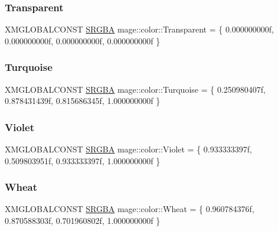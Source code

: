 \hypertarget{namespacemage_1_1color_a8f082eed46cfcf7c8c1c8bc206b6e501}{}\label{namespacemage_1_1color_a8f082eed46cfcf7c8c1c8bc206b6e501} 
\subsubsection{\texorpdfstring{Transparent}{Transparent}}
{\footnotesize\ttfamily X\+M\+G\+L\+O\+B\+A\+L\+C\+O\+N\+ST \hyperlink{structmage_1_1_s_r_g_b_a}{S\+R\+G\+BA} mage\+::color\+::\+Transparent = \{ 0.\+000000000f, 0.\+000000000f, 0.\+000000000f, 0.\+000000000f \}}

\hypertarget{namespacemage_1_1color_afb41a2ea6e693f2db82002ca69ca99a8}{}\label{namespacemage_1_1color_afb41a2ea6e693f2db82002ca69ca99a8} 
\subsubsection{\texorpdfstring{Turquoise}{Turquoise}}
{\footnotesize\ttfamily X\+M\+G\+L\+O\+B\+A\+L\+C\+O\+N\+ST \hyperlink{structmage_1_1_s_r_g_b_a}{S\+R\+G\+BA} mage\+::color\+::\+Turquoise = \{ 0.\+250980407f, 0.\+878431439f, 0.\+815686345f, 1.\+000000000f \}}

\hypertarget{namespacemage_1_1color_a8bdb9f0215a2545fa3b42d472cb83cc8}{}\label{namespacemage_1_1color_a8bdb9f0215a2545fa3b42d472cb83cc8} 
\subsubsection{\texorpdfstring{Violet}{Violet}}
{\footnotesize\ttfamily X\+M\+G\+L\+O\+B\+A\+L\+C\+O\+N\+ST \hyperlink{structmage_1_1_s_r_g_b_a}{S\+R\+G\+BA} mage\+::color\+::\+Violet = \{ 0.\+933333397f, 0.\+509803951f, 0.\+933333397f, 1.\+000000000f \}}

\hypertarget{namespacemage_1_1color_aaf821b2e2abf8783372e656a91517117}{}\label{namespacemage_1_1color_aaf821b2e2abf8783372e656a91517117} 
\subsubsection{\texorpdfstring{Wheat}{Wheat}}
{\footnotesize\ttfamily X\+M\+G\+L\+O\+B\+A\+L\+C\+O\+N\+ST \hyperlink{structmage_1_1_s_r_g_b_a}{S\+R\+G\+BA} mage\+::color\+::\+Wheat = \{ 0.\+960784376f, 0.\+870588303f, 0.\+701960802f, 1.\+000000000f \}}

